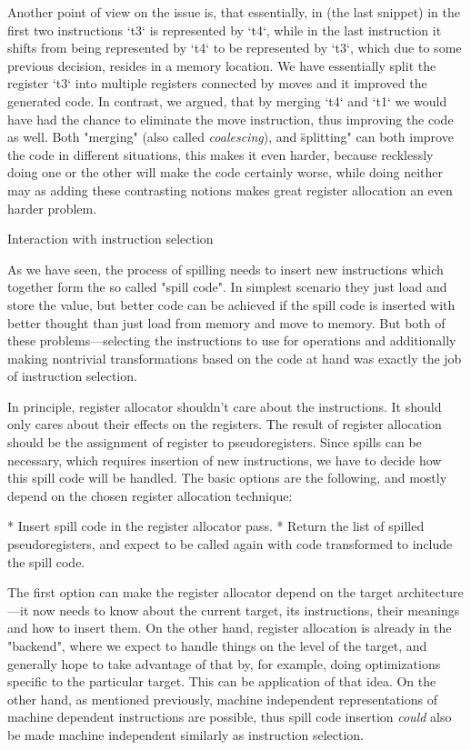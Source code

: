 Another point of view on the issue is, that essentially, in (the last snippet)
in the first two instructions `t3` is represented by `t4`, while in the last
instruction it shifts from being represented by `t4` to be represented by `t3`,
which due to some previous decision, resides in a memory location. We have
essentially split the register `t3` into multiple registers connected by moves
and it improved the generated code. In contrast, we argued, that by merging `t4`
and `t1` we would have had the chance to eliminate the move instruction, thus
improving the code as well. Both "merging" (also called {\em coalescing}), and
\"splitting" can both improve the code in different situations, this makes it
even harder, because recklessly doing one or the other will make the code
certainly worse, while doing neither may as adding these contrasting notions
makes great register allocation an even harder problem.

\secc Interaction with instruction selection

As we have seen, the process of spilling needs to insert new instructions which
together form the so called "spill code". In simplest scenario they just load
and store the value, but better code can be achieved if the spill code is
inserted with better thought than just load from memory and move to memory. But
both of these problems---selecting the instructions to use for operations and
additionally making nontrivial transformations based on the code at hand was
exactly the job of instruction selection.

In principle, register allocator shouldn't care about the instructions. It
should only cares about their effects on the registers. The result of register
allocation should be the assignment of register to pseudoregisters. Since spills
can be necessary, which requires insertion of new instructions, we have to
decide how this spill code will be handled. The basic options are the following,
and mostly depend on the chosen register allocation technique:

\begitems
* Insert spill code in the register allocator pass.
* Return the list of spilled pseudoregisters, and expect to be called again with
code transformed to include the spill code.
\enditems

The first option can make the register allocator depend on the target
architecture---it now needs to know about the current target, its instructions,
their meanings and how to insert them. On the other hand, register allocation is
already in the "backend", where we expect to handle things on the level of the
target, and generally hope to take advantage of that by, for example, doing
optimizations specific to the particular target. This can be application of that
idea. On the other hand, as mentioned previously, machine independent
representations of machine dependent instructions are possible, thus spill code
insertion {\em could} also be made machine independent similarly as instruction
selection.

